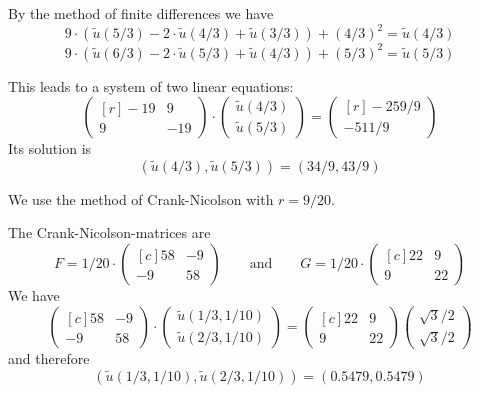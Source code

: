 \begin{loesung}
\begin{teilaufgaben}
\item
By the method of finite differences we have
\[
9 \cdot (\tilde u(5/3) - 2 \cdot \tilde u(4/3) + \tilde u(3/3)) + (4/3)^2 = \tilde u(4/3)
\]
\[
9 \cdot (\tilde u(6/3) - 2 \cdot \tilde u(5/3) + \tilde u(4/3)) + (5/3)^2 = \tilde u(5/3)
\]

This leads to a system of two linear equations:
\begin{equation}
\begin{pmatrix*}[r]
 -19 & 9 \\
   9 & -19
\end{pmatrix*}
\cdot
\begin{pmatrix}
\tilde u(4/3) \\
\tilde u(5/3)
\end{pmatrix}
=
\begin{pmatrix*}[r]
 -259/9  \\
 -511/9
\end{pmatrix*}
\tag{2P}
\end{equation}
Its solution is
\begin{equation}
(\tilde u(4/3),  \tilde u(5/3)) = (34/9 , 43/9)
\tag{\bf 1P}
\end{equation}

\item
We use the method of Crank-Nicolson with $r = 9/20$. 

\smallskip

The Crank-Nicolson-matrices are 
\begin{equation}
F
=
1/20
\cdot
\begin{pmatrix*}[c]
 58 & -9 \\
 -9 & 58
\end{pmatrix*}
\qquad \text{and}\qquad
G = 1/20 \cdot
\begin{pmatrix*}[c]
 22 & 9 \\
  9 & 22
\end{pmatrix*}
\tag{\bf 1P}
\end{equation}
We have
\[
\begin{pmatrix*}[c]
  58 & -9 \\
  -9 & 58
\end{pmatrix*}
\cdot
\begin{pmatrix}
\tilde u(1/3,1/10)  \\
\tilde u(2/3,1/10)
  \end{pmatrix}
=
\begin{pmatrix*}[c]
 22 & 9 \\
  9 & 22
\end{pmatrix*}
\begin{pmatrix}
 \sqrt{3}/2  \\
 \sqrt{3}/2
\end{pmatrix}
\]
and therefore
\begin{equation}
(\tilde u(1/3,1/10), \tilde u(2/3,1/10))
=
(0.5479, 0.5479)
\tag{\bf 1P}
\end{equation}


\end{teilaufgaben}
\end{loesung}
